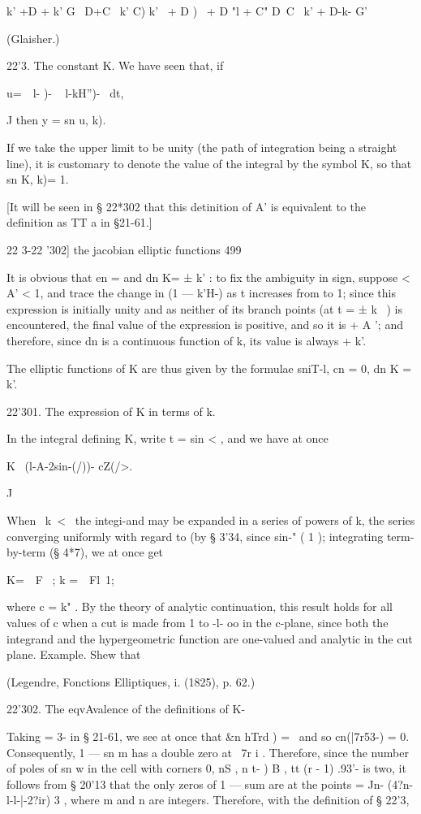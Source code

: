 k' +D + k' G \ D+C \ k' C) k' \ + D ) \ + D "l + C" D~C ~k' + D-k- G'

(Glaisher.)

22'3. The constant K. We have seen that, if

u=\ \ l- )- ~ l-kH'')- ~dt,

J then y = sn u, k).

If we take the upper limit to be unity (the path of integration being
a straight line), it is customary to denote the value of the integral
by the symbol K, so that sn K, k)= 1.

[It will be seen in § 22*302 that this detinition of A' is equivalent
to the definition as TT a in §21-61.]

22 3-22 '302] the jacobian elliptic functions 499

It is obvious that en = and dn K= ± k' : to fix the ambiguity in sign,
suppose < A' < 1, and trace the change in (1 — k'H-) as t increases
from to 1; since this expression is initially unity and as neither of
its branch points (at t = ± k~ ) is encountered, the final value of
the expression is positive, and so it is + A '; and therefore, since
dn is a continuous function of k, its value is always + k'.

The elliptic functions of K are thus given by the formulae sniT-l, cn
= 0, dn K = k'.

22'301. The expression of K in terms of k.

In the integral defining K, write t = sin < , and we have at once

K \ (l-A-2sin-(/))- cZ(/>.

J

When \ k\ < \, the integi-and may be expanded in a series of powers of
k, the series converging uniformly with regard to (by § 3'34, since
sin-" ( 1 ); integrating term-by-term (§ 4*7), we at once get

K=\ \ F \, ; k =\ \ Fl\, 1;

where c = k" . By the theory of analytic continuation, this result
holds for all values of c when a cut is made from 1 to -l- oo in the
c-plane, since both the integrand and the hypergeometric function are
one-valued and analytic in the cut plane. Example. Shew that

(Legendre, Fonctions Elliptiques, i. (1825), p. 62.)

22'302. The eqvAvalence of the definitions of K-

Taking = 3- in § 21-61, we see at once that \&n hTrd ) = \ and so
cn(|7r53-) = 0. Consequently, 1 — sn m has a double zero at \ 7r i .
Therefore, since the number of poles of sn w in the cell with corners
0, nS , n t- ) B , tt (r - 1) .93'- is two, it follows from § 20'13
that the only zeros of 1 — sum are at the points = Jn-
(4?n-l-l-|-2?ir) 3 , where m and n are integers. Therefore, with the
definition of § 22'3,

